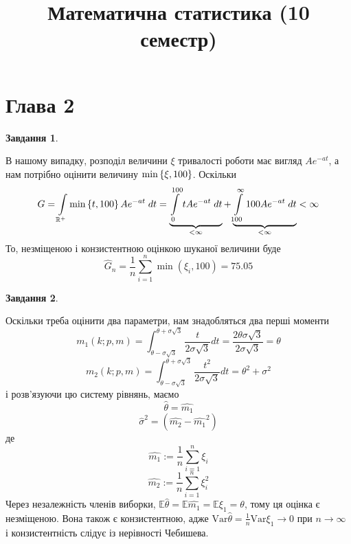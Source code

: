 \documentclass[12pt]{article} %
\title{Математична статистика (10 семестр)}
\author{}
\newtheorem{prob}{Завдання}
\newcommand{\Var}{\mbox{Var}}
\begin{document}
\maketitle
\section{Глава 2}
\setcounter{prob}{21}
\begin{prob}\end{prob}
	В нашому випадку, розподіл величини $\xi$ тривалості роботи має вигляд $Ae^{-at}$, а нам потрібно оцінити величину $\min\mycbra{\xi,100}$.
	Оскільки
	\[G=\int_{\mathbb{R}^+}\min\mycbra{t,100}Ae^{-at}\;dt=\underbrace{\int_0^{100}tAe^{-at}\;dt}_{<\infty}+\underbrace{\int_{100}^\infty
	100Ae^{-at}\;dt}_{<\infty}<\infty\]
	То, незміщеною і конзистентною оцінкою шуканої величини буде
	\[\hat{G}_n=\frac{1}{n}\sum_{i=1}^n\min(\xi_i,100)=75.05\]
\begin{prob}\end{prob}
	Оскільки треба оцінити два параметри, нам знадобляться два перші моменти
	\[m_1(k;p,m)=\int_{\theta-\sigma\sqrt{3}}^{\theta+\sigma\sqrt{3}}\frac{t}{2\sigma\sqrt{3}}dt=\frac{2\theta\sigma\sqrt{3}}{2\sigma\sqrt{3}}=
	\theta\]
	\[m_2(k;p,m)=\int_{\theta-\sigma\sqrt{3}}^{\theta+\sigma\sqrt{3}}\frac{t^2}{2\sigma\sqrt{3}}dt=\theta^2+\sigma^2\]
	і розв’язуючи цю систему рівнянь, маємо
	\[\hat{{\theta}}=\hat{m_1}\]
	\[\hat{\sigma}^2=(\hat{m_2}-\hat{m_1}^2)\]
	де
	\[\hat{m_1}:=\frac{1}{n}\sum_{i=1}^n\xi_i\]
	\[\hat{m_2}:=\frac{1}{n}\sum_{i=1}^n\xi^2_i\]
	Через незалежність членів виборки, $\mathbb{E}\hat{\theta}=\mathbb{E}\hat{m_1}=\mathbb{E}\xi_1=\theta$, тому ця оцінка є незміщеною. Вона
	також є конзистентною, адже $\Var\hat{\theta}=\frac{1}{n}\Var\xi_1\to0$ при $n\to\infty$ і конзистентність слідує із нерівності Чебишева.
\end{document}
